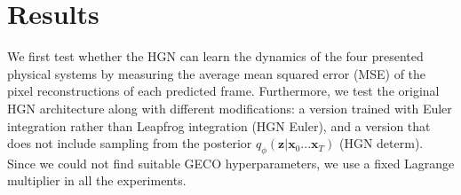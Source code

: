




\section{Results} \label{sec:reproduction}

We first test whether the HGN \cite{hgn} can learn the dynamics of the four presented physical systems by measuring the average mean squared error (MSE) of the pixel reconstructions of each predicted frame.
Furthermore, we test the original HGN architecture along with different modifications: a version trained with Euler integration rather than Leapfrog integration (HGN Euler),
and a version that does not include sampling from the posterior $q_\phi(\bm{z}|\bm{x}_0 ... \bm{x}_T)$ (HGN determ). Since we could not find suitable GECO\cite{geco} hyperparameters, we use a fixed Lagrange multiplier\cite{beta-vae} in all the experiments.

